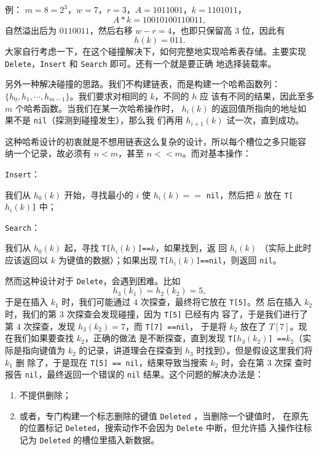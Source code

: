 \documentclass[a4paper]{ctexart}
\theoremstyle{definition}
\theoremstyle{definition}
\begin{document}
例： $m = 8 = 2^3$，$w = 7$，$r = 3$，$A = 1011001$，$k = 1101011$，
$$
A * k = 10010100110011,
$$
自然溢出后为 $0110011$，然后右移 $w - r = 4$，也即只保留高 $3$ 位，因此有
$$
h(k) = 011.
$$
大家自行考虑一下，在这个碰撞解决下，如何完整地实现哈希表存储。主要实现
\verb|Delete|，\verb|Insert| 和 \verb|Search| 即可。还有一个就是要正确
地选择装载率。

另外一种解决碰撞的思路。我们不构建链表，而是构建一个哈希函数列：
$\{h_0, h_1, \cdots, h_{m - 1}\}$。我们要求对相同的 $k$，不同的 $h$ 应
该有不同的结果，因此至多 $m$ 个哈希函数。当我们在某一次哈希操作时，
$h_i(k)$ 的返回值所指向的地址如果不是 \verb|nil|（探测到碰撞发生），那么我
们再用 $h_{i + 1}(k)$ 试一次，直到成功。

这种哈希设计的初衷就是不想用链表这么复杂的设计，所以每个槽位之多只能容
纳一个记录，故必须有 $n < m$，甚至 $n << m$。而对基本操作：

\verb|Insert|：

我们从 $h_0(k)$ 开始，寻找最小的 $i$ 使 $h_i(k) ==$
\verb|nil|，然后把 $k$ 放在 \verb|T[|$h_i(k)$\verb|]| 中；

\verb|Search|：

我们从 $h_0(k)$ 起，寻找 \verb|T[|$h_i(k)$\verb|]==|$k$，如果找到，返
回 $h_i(k)$ （实际上此时应该返回以 $k$ 为键值的数据）；如果出现
\verb|T[|$h_i(k)$\verb|]==nil|，则返回 \verb|nil|。

然而这种设计对于 \verb|Delete|，会遇到困难。比如 
$$
h_3(k_1) = h_2(k_2) = 5, 
$$
于是在插入 $k_1$ 时，我们可能通过 $4$ 次探查，最终将它放在 \verb|T[5]|。然
后在插入 $k_2$ 时，我们的第 $3$ 次探查会发现碰撞，因为 \verb|T[5]| 已经有内
容了，于是我们进行了第 $4$ 次探查，发现 $h_3(k_2) = 7$，而
\verb|T[7] ==nil|，
于是将 $k_2$ 放在了 $T[7]$。现在我们如果要查找 $k_2$，正确的做法
是不断探查，直到发现 \verb|T[|$h_3(k_2)$\verb|] ==|$k_2$（实际是指向键值为 $k_2$
  的记录，讲道理会在探查到 $h_3$ 时找到）。但是假设这里我们将 $k_1$ 删
除了，于是现在 \verb|T[5] == nil|，结果导致当搜索 $k_2$ 时，会在第 $3$ 次探
查时报告 \verb|nil|，最终返回一个错误的 \verb|nil| 结果。这个问题的解决办法是：

\begin{enumerate}
\item 不提供删除；
\item 或者，专门构建一个标志删除的键值 \verb|Deleted| ，当删除一个键值时，
  在原先的位置标记 \verb|Deleted|，搜索动作不会因为 \verb|Delete| 中断，但允许插
  入操作往标记为 \verb|Deleted| 的槽位里插入新数据。
\end{enumerate}
\end{document}
